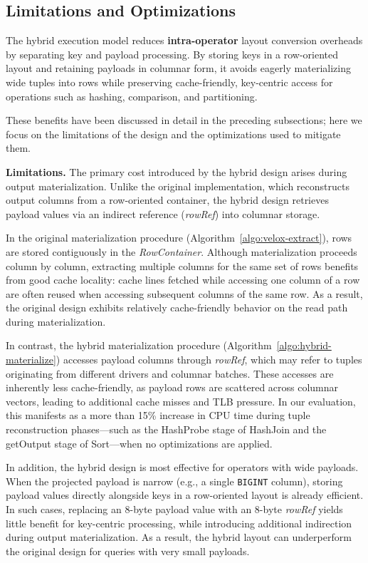 \subsection{Limitations and Optimizations}

The hybrid execution model reduces \textbf{intra-operator} layout conversion overheads by separating key and payload processing.
By storing keys in a row-oriented layout and retaining payloads in columnar form, it avoids eagerly materializing wide tuples into rows while preserving cache-friendly, key-centric access for operations such as hashing, comparison, and partitioning.

These benefits have been discussed in detail in the preceding subsections; here we focus on the limitations of the design and the optimizations used to mitigate them.

\medskip
\noindent\textbf{Limitations.}
The primary cost introduced by the hybrid design arises during output materialization.
Unlike the original implementation, which reconstructs output columns from a row-oriented container, the hybrid design retrieves payload values via an indirect reference (\emph{rowRef}) into columnar storage.

In the original materialization procedure (Algorithm~\ref{algo:velox-extract}), rows are stored contiguously in the \emph{RowContainer}.
Although materialization proceeds column by column, extracting multiple columns for the same set of rows benefits from good cache locality: cache lines fetched while accessing one column of a row are often reused when accessing subsequent columns of the same row.
As a result, the original design exhibits relatively cache-friendly behavior on the read path during materialization.

In contrast, the hybrid materialization procedure (Algorithm~\ref{algo:hybrid-materialize}) accesses payload columns through \emph{rowRef}, which may refer to tuples originating from different drivers and columnar batches.
These accesses are inherently less cache-friendly, as payload rows are scattered across columnar vectors, leading to additional cache misses and TLB pressure.
In our evaluation, this manifests as a more than 15\% increase in CPU time during tuple reconstruction phases—such as the HashProbe stage of HashJoin and the getOutput stage of Sort—when no optimizations are applied.

In addition, the hybrid design is most effective for operators with wide payloads.
When the projected payload is narrow (e.g., a single \texttt{BIGINT} column), storing payload values directly alongside keys in a row-oriented layout is already efficient.
In such cases, replacing an 8-byte payload value with an 8-byte \emph{rowRef} yields little benefit for key-centric processing, while introducing additional indirection during output materialization.
As a result, the hybrid layout can underperform the original design for queries with very small payloads.

